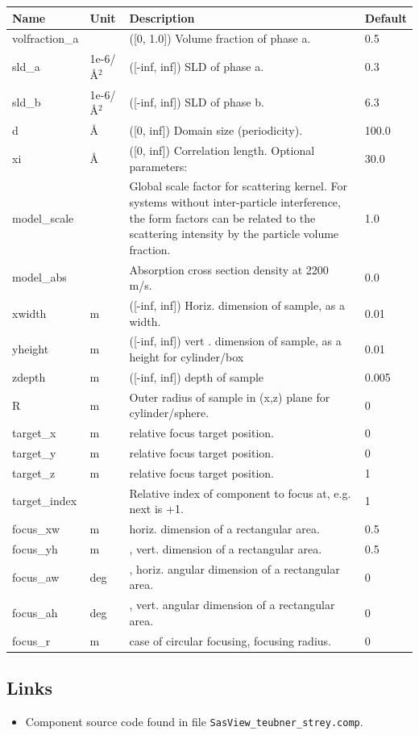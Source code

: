 \begin{longtable}{p{}p{}p{}p{}}
\toprule
\textbf{Name} & \textbf{Unit} & \textbf{Description} & \textbf{Default} \\
\midrule
\endhead
volfraction\_a &  & ([0, 1.0]) Volume fraction of phase a. & 0.5 \\
sld\_a & 1e-6/\AA{}$^{2}$ & ([-inf, inf]) SLD of phase a. & 0.3 \\
sld\_b & 1e-6/\AA{}$^{2}$ & ([-inf, inf]) SLD of phase b. & 6.3 \\
d & \AA{} & ([0, inf]) Domain size (periodicity). & 100.0 \\
xi & \AA{} & ([0, inf]) Correlation length. Optional parameters: & 30.0 \\
model\_scale &   & Global scale factor for scattering kernel. For systems without inter-particle interference, the form factors can be related to the scattering intensity by the particle volume fraction. & 1.0 \\
model\_abs &   & Absorption cross section density at 2200 m/s. & 0.0 \\
xwidth & m & ([-inf, inf]) Horiz. dimension of sample, as a width. & 0.01 \\
yheight & m & ([-inf, inf]) vert . dimension of sample, as a height for cylinder/box & 0.01 \\
zdepth & m & ([-inf, inf]) depth of sample & 0.005 \\
R & m & Outer radius of sample in (x,z) plane for cylinder/sphere. & 0 \\
target\_x & m & relative focus target position. & 0 \\
target\_y & m & relative focus target position. & 0 \\
target\_z & m & relative focus target position. & 1 \\
target\_index &   & Relative index of component to focus at, e.g. next is +1. & 1 \\
focus\_xw & m & horiz. dimension of a rectangular area. & 0.5 \\
focus\_yh & m & , vert. dimension of a rectangular area. & 0.5 \\
focus\_aw & deg & , horiz. angular dimension of a rectangular area. & 0 \\
focus\_ah & deg & , vert. angular dimension of a rectangular area. & 0 \\
focus\_r & m & case of circular focusing, focusing radius. & 0 \\
\bottomrule
\end{longtable}

\subsection*{Links}
\begin{itemize}
  \item Component source code found in file \texttt{SasView\_teubner\_strey.comp}.
\end{itemize}
